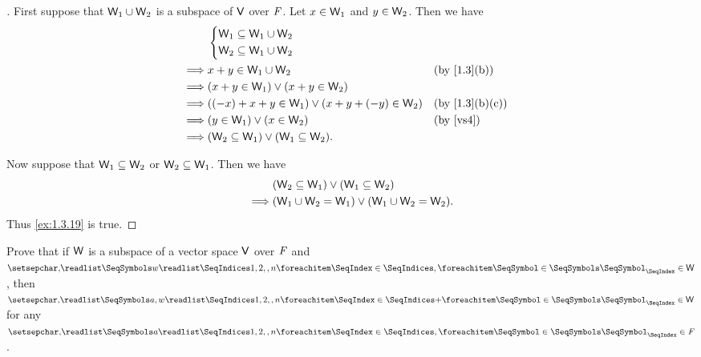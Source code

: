 \begin{proof}[]
  First suppose that \(\mathsf{W}_1 \cup \mathsf{W}_2\) is a subspace of \(\mathsf{V}\) over \(\mathit{F}\).
  Let \(x \in \mathsf{W}_1\) and \(y \in \mathsf{W}_2\).
  Then we have
  \begin{align*}
             & \begin{dcases}
      \W_1 \subseteq \W_1 \cup \W_2 \\
      \W_2 \subseteq \W_1 \cup \W_2
    \end{dcases}                                                             \\
    \implies & x + y \in \W_1 \cup \W_2                             &  & \text{(by \cref{1.3}(b))}    \\
    \implies & (x + y \in \W_1) \lor (x + y \in \W_2)                                                 \\
    \implies & ((-x) + x + y \in \W_1) \lor (x + y + (-y) \in \W_2) &  & \text{(by \cref{1.3}(b)(c))} \\
    \implies & (y \in \W_1) \lor (x \in \W_2)                       &  & \text{(by \ref{vs4})}        \\
    \implies & (\W_2 \subseteq \W_1) \lor (\W_1 \subseteq \W_2).
  \end{align*}

  Now suppose that \(\mathsf{W}_1 \subseteq \mathsf{W}_2\) or \(\mathsf{W}_2 \subseteq \mathsf{W}_1\).
  Then we have
  \begin{align*}
             & (\mathsf{W}_2 \subseteq \mathsf{W}_1) \lor (\mathsf{W}_1 \subseteq \mathsf{W}_2)      \\
    \implies & (\mathsf{W}_1 \cup \mathsf{W}_2 = \mathsf{W}_1) \lor (\mathsf{W}_1 \cup \mathsf{W}_2 = \mathsf{W}_2).
  \end{align*}
  Thus \cref{ex:1.3.19} is true.
\end{proof}

\begin{ex}\label{ex:1.3.20}
  Prove that if \(\mathsf{W}\) is a subspace of a vector space \(\mathsf{V}\) over \(\mathit{F}\) and \(\seq{w}{1,2,,n} \in \W\), then \(\seq[+]{a,w}{1,2,,n} \in \W\) for any \(\seq{a}{1,2,,n} \in \F\).
\end{ex}

